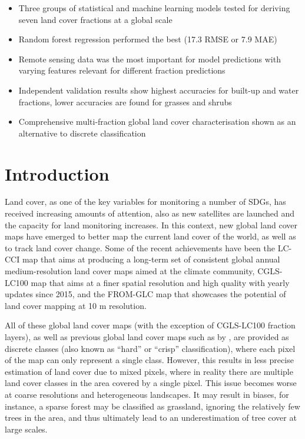 \documentclass[review,authoryear,3p]{elsarticle}
\begin{document}
\begin{itemize}
    \item Three groups of statistical and machine learning models tested for deriving seven land cover fractions at a global scale
    \item Random forest regression performed the best (17.3 RMSE or 7.9 MAE)
    \item Remote sensing data was the most important for model predictions with varying features relevant for different fraction predictions
    \item Independent validation results show highest accuracies for built-up and water fractions, lower accuracies are found for grasses and shrubs
    \item Comprehensive multi-fraction global land cover characterisation shown as an alternative to discrete classification
\end{itemize}




\section{Introduction}

Land cover, as one of the key variables for monitoring a number of \glspl{SDG}, has received increasing amounts of attention, also as new satellites are launched and the capacity for land monitoring increases.
In this context, new global land cover maps have emerged to better map the current land cover of the world, as well as to track land cover change.
Some of the recent achievements have been the \ac{LC-CCI} map \citep{defourny2012cci} that aims at producing a long-term set of consistent global annual medium-resolution land cover maps aimed at the climate community, \ac{CGLS-LC100} map \citep{buchhorn_moderate_2019} that aims at a finer spatial resolution and high quality with yearly updates since 2015, and the \ac{FROM-GLC} map \citep{fromglc2019} that showcases the potential of land cover mapping at 10 m resolution.

All of these global land cover maps (with the exception of \ac{CGLS-LC100} fraction layers), as well as previous global land cover maps such as by \citet{bartholome2005glc2000, friedl2010modis, arino2007globcover, see2015hybrid, chen2015globeland30}, are provided as discrete classes (also known as ``hard'' or ``crisp'' classification), where each pixel of the map can only represent a single class.
However, this results in less precise estimation of land cover due to mixed pixels, where in reality there are multiple land cover classes in the area covered by a single pixel.
This issue becomes worse at coarse resolutions and heterogeneous landscapes.
It may result in biases, for instance, a sparse forest may be classified as grassland, ignoring the relatively few trees in the area, and thus ultimately lead to an underestimation of tree cover at large scales.
\end{document}
